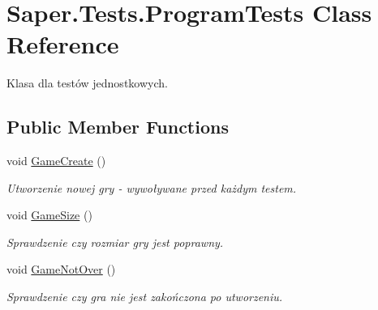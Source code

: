 \hypertarget{class_saper_1_1_tests_1_1_program_tests}{}\section{Saper.\+Tests.\+Program\+Tests Class Reference}
\label{class_saper_1_1_tests_1_1_program_tests}


Klasa dla testów jednostkowych.  


\subsection*{Public Member Functions}
\begin{DoxyCompactItemize}
\item 
\mbox{\label{class_saper_1_1_tests_1_1_program_tests_a9774585fffb849f9c8b33c6e351748d8}} 
void \mbox{\hyperlink{class_saper_1_1_tests_1_1_program_tests_a9774585fffb849f9c8b33c6e351748d8}{Game\+Create}} ()
\begin{DoxyCompactList}\small\item\em Utworzenie nowej gry -\/ wywoływane przed każdym testem. \end{DoxyCompactList}\item 
\mbox{\label{class_saper_1_1_tests_1_1_program_tests_afef65abd57fa4fd8ef39967855e4c1b2}} 
void \mbox{\hyperlink{class_saper_1_1_tests_1_1_program_tests_afef65abd57fa4fd8ef39967855e4c1b2}{Game\+Size}} ()
\begin{DoxyCompactList}\small\item\em Sprawdzenie czy rozmiar gry jest poprawny. \end{DoxyCompactList}\item 
\mbox{\label{class_saper_1_1_tests_1_1_program_tests_a21d337cc8f3c53f0296a8853c2783818}} 
void \mbox{\hyperlink{class_saper_1_1_tests_1_1_program_tests_a21d337cc8f3c53f0296a8853c2783818}{Game\+Not\+Over}} ()
\begin{DoxyCompactList}\small\item\em Sprawdzenie czy gra nie jest zakończona po utworzeniu. \end{DoxyCompactList}\item 
\mbox{\label{class_saper_1_1_tests_1_1_program_tests_ad11f91c967457113e7ee5f43c4ff54a1}} 

\end{DoxyCompactItemize}
